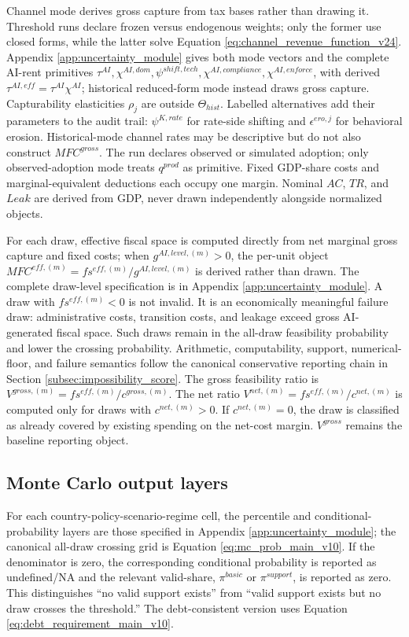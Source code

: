 \documentclass[11pt,a4paper]{article}
\begin{document}
Channel mode derives gross capture from tax bases rather than drawing it. Threshold runs declare frozen versus endogenous weights; only the former use closed forms, while the latter solve Equation \eqref{eq:channel_revenue_function_v24}. Appendix \ref{app:uncertainty_module} gives both mode vectors and the complete AI-rent primitives $\tau^{AI},\chi^{AI,dom},\psi^{shift,tech},\chi^{AI,compliance},\chi^{AI,enforce}$, with derived $\tau^{AI,eff}=\tau^{AI}\chi^{AI}$; historical reduced-form mode instead draws gross capture.
Capturability elasticities $\rho_j$ are outside $\Theta_{hist}$. Labelled alternatives add their parameters to the audit trail: $\psi^{K,rate}$ for rate-side shifting and $\epsilon^{ero,j}$ for behavioral erosion.
Historical-mode channel rates may be descriptive but do not also construct $MFC^{gross}$. The run declares observed or simulated adoption; only observed-adoption mode treats $q^{prod}$ as primitive. Fixed GDP-share costs and marginal-equivalent deductions each occupy one margin. Nominal $AC$, $TR$, and $Leak$ are derived from GDP, never drawn independently alongside normalized objects.

For each draw, effective fiscal space is computed directly from net marginal gross capture and fixed costs; when $g^{AI,level,(m)}>0$, the per-unit object $MFC^{eff,(m)}=fs^{eff,(m)}/g^{AI,level,(m)}$ is derived rather than drawn. The complete draw-level specification is in Appendix \ref{app:uncertainty_module}.
A draw with $fs^{eff,(m)}<0$ is not invalid. It is an economically meaningful failure draw: administrative costs, transition costs, and leakage exceed gross AI-generated fiscal space. Such draws remain in the all-draw feasibility probability and lower the crossing probability.
Arithmetic, computability, support, numerical-floor, and failure semantics follow the canonical conservative reporting chain in Section \ref{subsec:impossibility_score}.
The gross feasibility ratio is $V^{gross,(m)}=fs^{eff,(m)}/c^{gross,(m)}$. The net ratio $V^{net,(m)}=fs^{eff,(m)}/c^{net,(m)}$ is computed only for draws with $c^{net,(m)}>0$.
If $c^{net,(m)}=0$, the draw is classified as already covered by existing spending on the net-cost margin. $V^{gross}$ remains the baseline reporting object.

\subsection{Monte Carlo output layers}

For each country-policy-scenario-regime cell, the percentile and conditional-probability layers are those specified in Appendix \ref{app:uncertainty_module}; the canonical all-draw crossing grid is Equation \eqref{eq:mc_prob_main_v10}.
If the denominator is zero, the corresponding conditional probability is reported as undefined/NA and the relevant valid-share, $\pi^{basic}$ or $\pi^{support}$, is reported as zero. This distinguishes ``no valid support exists'' from ``valid support exists but no draw crosses the threshold.'' The debt-consistent version uses Equation \eqref{eq:debt_requirement_main_v10}.
\end{document}
